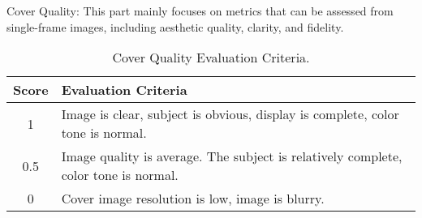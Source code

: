 \newpage
Cover Quality: This part mainly focuses on metrics that can be assessed from single-frame images, including aesthetic quality, clarity, and fidelity.

\begin{table}[h]
\centering
\caption{Cover Quality Evaluation Criteria.}
\label{sample-table}
\small

\begin{tabular}{cp{11cm}}
\toprule

\textbf{Score} & \textbf{Evaluation Criteria} \\
\midrule
1 & Image is clear, subject is obvious, display is complete, color tone is normal. \\
\midrule
0.5 & Image quality is average. The subject is relatively complete, color tone is normal. \\
\midrule
0 & Cover image resolution is low, image is blurry. \\

\bottomrule
\end{tabular}
\end{table}
